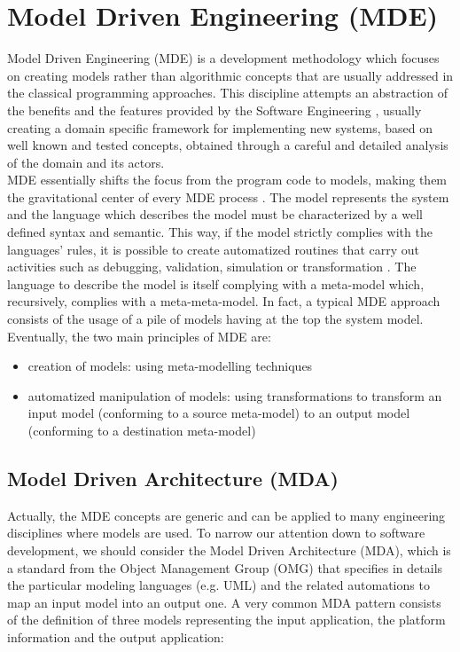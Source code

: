 \section{Model Driven Engineering (MDE)}
\label{ModelDrivenEngineering}
Model Driven Engineering (MDE) is a development methodology which focuses on creating models rather than algorithmic concepts that are usually addressed in the classical programming approaches.
This discipline attempts an abstraction of the benefits and the features provided by the Software Engineering \cite{Marrone}, usually creating a domain specific framework for implementing new systems, based on well known and tested concepts, obtained through a careful and detailed analysis of the domain and its actors.\\
%
MDE essentially shifts the focus from the program code to models, making them the gravitational center of every MDE process \cite{Lukman08}. The model represents the system and the language which describes the model must be characterized by a well defined syntax and semantic. This way, if the model strictly complies with the languages' rules, it is possible to create automatized routines that carry out activities such as debugging, validation, simulation or transformation \cite{Papa11}. 
The language to describe the model is itself complying with a meta-model which, recursively, complies with a meta-meta-model. In fact, a typical MDE approach consists of the usage of a pile of models having at the top the system model. \\
%
Eventually, the two main principles of MDE are:
\begin{itemize}
 \item creation of models: using meta-modelling techniques
 \item automatized manipulation of models: using transformations to transform an input model (conforming to a source meta-model) to an output model (conforming to a destination meta-model)
\end{itemize}

\subsection{Model Driven Architecture (MDA)}
\label{MDA}
Actually, the MDE concepts are generic and can be applied to many engineering disciplines where models are used. To narrow our attention down to software development, we should consider the Model Driven Architecture (MDA), which is a standard from the Object Management Group (OMG) that specifies in details the particular modeling languages (e.g. UML) and the related automations to map an input model into an output one.
A very common MDA pattern consists of the definition of three models \cite{Marrone} representing the input application, the platform information and the output application:

